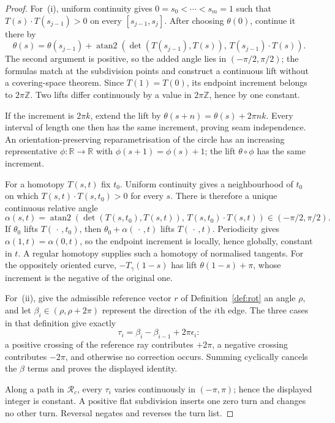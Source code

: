 \begin{proof}
For~(i), uniform continuity gives
$0=s_0<\cdots<s_m=1$ such that
$T(s)\cdot T(s_{j-1})>0$ on every
$[s_{j-1},s_j]$. After choosing $\theta(0)$, continue it there by
\[
 \theta(s)=\theta(s_{j-1})+
 \operatorname{atan2}\!\left(
   \det(T(s_{j-1}),T(s)),\,
   T(s_{j-1})\cdot T(s)\right).
\]
The second argument is positive, so the added angle lies in
$(-\pi/2,\pi/2)$; the formulas match at the subdivision points and construct a
continuous lift without a covering-space theorem. Since $T(1)=T(0)$, its
endpoint increment belongs to $2\pi\mathbb Z$. Two lifts differ continuously
by a value in $2\pi\mathbb Z$, hence by one constant.

If the increment is $2\pi k$, extend the lift by
$\theta(s+n)=\theta(s)+2\pi nk$. Every interval of length one then has the same
increment, proving seam independence. An orientation-preserving
reparametrisation of the circle has an increasing representative
$\phi\colon\mathbb R\to\mathbb R$ with
$\phi(s+1)=\phi(s)+1$; the lift $\theta\circ\phi$ has the same increment.

For a homotopy $T(s,t)$ fix $t_0$. Uniform continuity gives a neighbourhood of
$t_0$ on which
$T(s,t)\cdot T(s,t_0)>0$ for every $s$. There is therefore
a unique continuous relative angle
\[
 \alpha(s,t)=\operatorname{atan2}\!\left(
 \det(T(s,t_0),T(s,t)),\,
 T(s,t_0)\cdot T(s,t)\right)
 \in(-\pi/2,\pi/2).
\]
If $\theta_0$ lifts $T(\,\cdot\,,t_0)$, then
$\theta_0+\alpha(\,\cdot\,,t)$ lifts $T(\,\cdot\,,t)$.
Periodicity gives $\alpha(1,t)=\alpha(0,t)$, so the endpoint increment is
locally, hence globally, constant in $t$. A regular homotopy supplies such a
homotopy of normalised tangents. For the oppositely oriented curve,
$-T_\gamma(1-s)$ has lift $\theta(1-s)+\pi$, whose increment is the negative
of the original one.

For~(ii), give the admissible reference vector $r$ of
Definition~\ref{def:rot} an angle $\rho$, and let
$\beta_i\in(\rho,\rho+2\pi)$ represent the direction of the $i$th edge.
The three cases in that definition give exactly
\[
   \tau_i=\beta_i-\beta_{i-1}+2\pi\epsilon_i:
\]
a positive crossing of the reference ray contributes $+2\pi$, a negative
crossing contributes $-2\pi$, and otherwise no correction occurs.
Summing cyclically cancels the $\beta$ terms and proves the displayed identity.

Along a path in $\mathcal R_c$, every $\tau_i$ varies continuously in
$(-\pi,\pi)$; hence the displayed integer is constant. A positive flat
subdivision inserts one zero turn and changes no other turn. Reversal negates
and reverses the turn list.


\end{proof}
